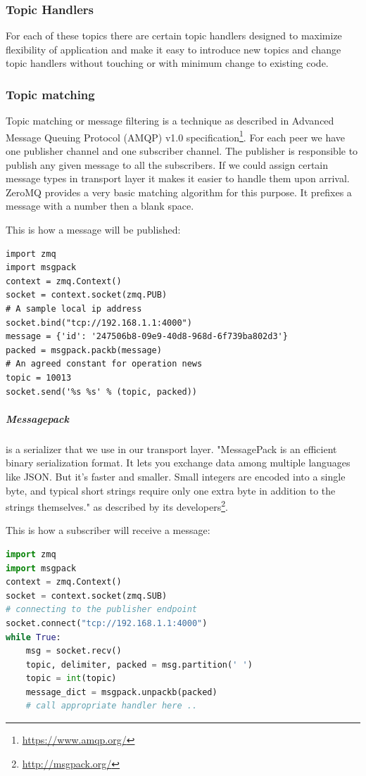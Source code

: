 \subsubsection{Topic  Handlers}
For each of these topics there are certain topic handlers designed to maximize flexibility of application and
make it easy to introduce new topics and change topic handlers without touching or with minimum change to existing code.

\subsubsection{Topic matching}
Topic matching or message filtering is a technique as described 
in Advanced Message Queuing Protocol (AMQP) v1.0 specification\footnote{\url{https://www.amqp.org/}}.
For each peer we have one publisher channel and one subscriber channel. 
The publisher is responsible to publish any given message to all the subscribers.
If we could assign certain message types in transport layer it makes it easier
to handle them upon arrival. 
ZeroMQ provides a very basic matching algorithm for this purpose.
It prefixes a message with a number then a blank space. 

This is how a message will be published:
\begin{lstlisting}[caption={Publisher sends packed messages}]
import zmq
import msgpack
context = zmq.Context()
socket = context.socket(zmq.PUB)
# A sample local ip address
socket.bind("tcp://192.168.1.1:4000") 
message = {'id': '247506b8-09e9-40d8-968d-6f739ba802d3'}
packed = msgpack.packb(message)
# An agreed constant for operation news
topic = 10013
socket.send('%s %s' % (topic, packed))
\end{lstlisting}

\subparagraph{Messagepack} is a serializer that we use in our transport layer. 
"MessagePack is an efficient binary serialization format. 
It lets you exchange data among multiple languages like JSON.
But it's faster and smaller. 
Small integers are encoded into a single byte, 
and typical short strings require only one extra byte in addition to the strings themselves."
as described by its developers\footnote{\url{http://msgpack.org/}}.

This is how a subscriber will receive a message:
\begin{lstlisting}[language=python, caption={Subscriber receives and unpacks a message}]
import zmq
import msgpack
context = zmq.Context()
socket = context.socket(zmq.SUB)
# connecting to the publisher endpoint
socket.connect("tcp://192.168.1.1:4000")
while True:
    msg = socket.recv()
    topic, delimiter, packed = msg.partition(' ')
    topic = int(topic)
    message_dict = msgpack.unpackb(packed)
    # call appropriate handler here ..
\end{lstlisting}


